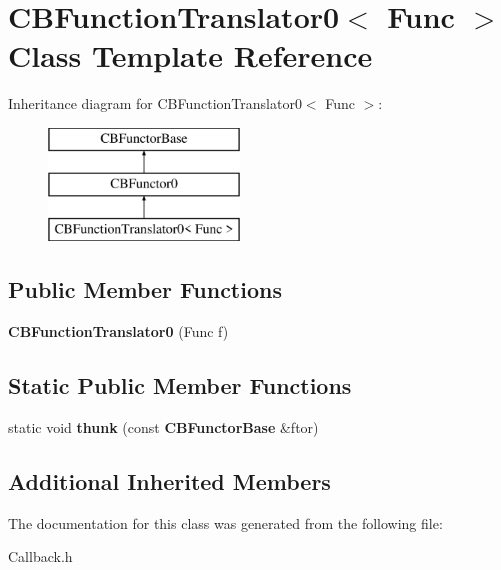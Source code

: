 \section{C\+B\+Function\+Translator0$<$ Func $>$ Class Template Reference}
\label{classCBFunctionTranslator0}
Inheritance diagram for C\+B\+Function\+Translator0$<$ Func $>$\+:\begin{figure}[H]
\begin{center}
\leavevmode
\includegraphics[height=3.000000cm]{classCBFunctionTranslator0}
\end{center}
\end{figure}
\subsection*{Public Member Functions}
\begin{DoxyCompactItemize}
\item 
{\bfseries C\+B\+Function\+Translator0} (Func f)\label{classCBFunctionTranslator0_a61103ab74629845b2d346a3f0920926f}

\end{DoxyCompactItemize}
\subsection*{Static Public Member Functions}
\begin{DoxyCompactItemize}
\item 
static void {\bfseries thunk} (const {\bf C\+B\+Functor\+Base} \&ftor)\label{classCBFunctionTranslator0_aeff9debdc4e6a3678d12e026b617612a}

\end{DoxyCompactItemize}
\subsection*{Additional Inherited Members}


The documentation for this class was generated from the following file\+:\begin{DoxyCompactItemize}
\item 
Callback.\+h\end{DoxyCompactItemize}
